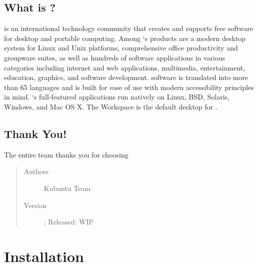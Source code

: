 \documentclass[letterpaper,10pt,english]{sphinxmanual}
\begin{document}
\section{What is ?}
\label{\detokenize{welcome:what-is-kde}}
 is an international technology community that creates and supports free software for desktop and portable computing. Among `s products are a modern desktop system for Linux and Unix platforms, comprehensive office productivity and groupware suites, as well as hundreds of software applications in various categories including internet and web applications, multimedia, entertainment, education, graphics, and software development.  software is translated into more than 65 languages and is built for ease of use with modern accessibility principles in mind. `s full-featured applications run natively on Linux, BSD, Solaris, Windows, and Mac OS X. The  Workspace is the default desktop for .


\section{Thank You!}
\label{\detokenize{welcome:thank-you}}
The entire  team thanks you for choosing 
\begin{quote}\begin{description}
\item[{Authors}] \leavevmode
Kubuntu Team

\item[{Version}]  ; Released: WIP

\end{description}\end{quote}


\chapter{Installation}
\label{\detokenize{docs/installation::doc}}\label{\detokenize{docs/installation:installation}}
\end{document}
